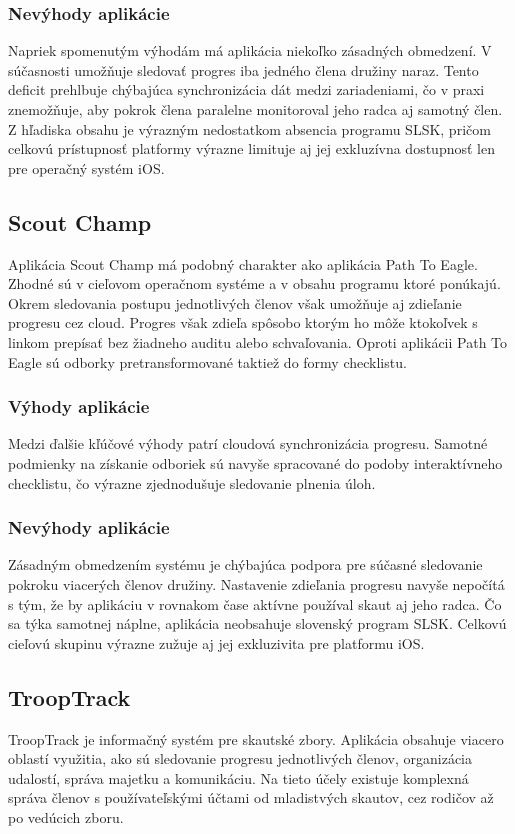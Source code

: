 \subsubsection{Nevýhody aplikácie}
Napriek spomenutým výhodám má aplikácia niekoľko zásadných obmedzení. V súčasnosti umožňuje sledovať progres iba jedného člena družiny naraz. Tento deficit prehlbuje chýbajúca synchronizácia dát medzi zariadeniami, čo v praxi znemožňuje, aby pokrok člena paralelne monitoroval jeho radca aj samotný člen. Z hľadiska obsahu je výrazným nedostatkom absencia programu SLSK, pričom celkovú prístupnosť platformy výrazne limituje aj jej exkluzívna dostupnosť len pre operačný systém iOS.
\cite{path_to_eagle}

\subsection{Scout Champ}
Aplikácia Scout Champ má podobný charakter ako aplikácia Path To Eagle. Zhodné sú v cieľovom operačnom systéme a v obsahu programu ktoré ponúkajú. Okrem sledovania postupu jednotlivých členov však umožňuje aj zdieľanie progresu cez cloud. Progres však zdieľa spôsobo ktorým ho môže ktokoľvek s linkom prepísať bez žiadneho auditu alebo schvaľovania. Oproti aplikácii Path To Eagle sú odborky pretransformované taktiež do formy checklistu.

\subsubsection{Výhody aplikácie}
Medzi ďalšie kľúčové výhody patrí cloudová synchronizácia progresu. Samotné podmienky na získanie odboriek sú navyše spracované do podoby interaktívneho checklistu, čo výrazne zjednodušuje sledovanie plnenia úloh.

\subsubsection{Nevýhody aplikácie}
Zásadným obmedzením systému je chýbajúca podpora pre súčasné sledovanie pokroku viacerých členov družiny. Nastavenie zdieľania progresu navyše nepočítá s tým, že by aplikáciu v rovnakom čase aktívne používal skaut aj jeho radca. Čo sa týka samotnej náplne, aplikácia neobsahuje slovenský program SLSK. Celkovú cieľovú skupinu výrazne zužuje aj jej exkluzivita pre platformu iOS.
\cite{scout_champ}

\subsection{TroopTrack}
TroopTrack je informačný systém pre skautské zbory. Aplikácia obsahuje viacero oblastí využitia, ako sú sledovanie progresu jednotlivých členov, organizácia udalostí, správa majetku a komunikáciu. Na tieto účely existuje komplexná správa členov s používateľskými účtami od mladistvých skautov, cez rodičov až po vedúcich zboru. 
\cite{trooptrack}

